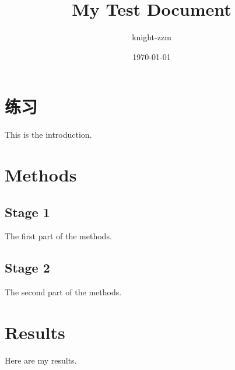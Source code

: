 \documentclass[a4paper,12pt]{report}
\begin{document}
\title{My Test Document}
\author{knight-zzm}
\date{\today}
\maketitle

\section{练习}
This is the introduction.

\section{Methods}

\subsection{Stage 1}
The first part of the methods.

\subsection{Stage 2}
The second part of the methods.

\section{Results}
Here are my results.
\end{document}
